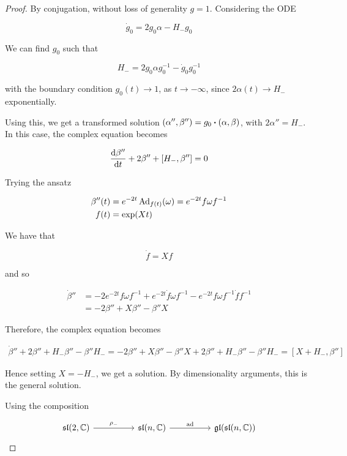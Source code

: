 \documentclass{report}
\renewcommand{\sl}{\mathfrak{sl}}
\begin{document}
\begin{proof}
    By conjugation, without loss of generality \(g = 1\). Considering the ODE

    \begin{equation*}
            \dot g_0 = 2g_0\alpha - H_-g_0
    \end{equation*}

    We can find \(g_0\) such that

    \[H_- = 2g_0\alpha g_0^{-1} - \dot g_0 g_0^{-1}\]

    with the boundary condition \(g_0(t) \to 1\), as \(t \to -\infty\), since \(2\alpha(t) \to H_-\) exponentially.

    Using this, we get a transformed solution \((\alpha'', \beta'') = g_0\vdot(\alpha,\beta)\), with \(2\alpha'' = H_-\). In this case, the complex equation becomes

    \[\dv{\beta''}{t} + 2\beta'' + [H_-, \beta''] = 0\]

    Trying the ansatz

    \begin{align*}
        \beta''(t) &= e^{-2t}\operatorname{Ad}_{f(t)}(\omega) = e^{-2t}f\omega f^{-1} \\
        f(t) &= \exp(Xt)
    \end{align*}

    We have that

    \[\dot f = Xf\]

    and so

    \begin{align*}
        \dot\beta'' &= -2e^{-2t}f\omega f^{-1} + e^{-2t}\dot f \omega f^{-1} - e^{-2t}f\omega f^{-1}\dot f f^{-1} \\
        &= -2\beta'' + X\beta'' - \beta'' X
    \end{align*}

    Therefore, the complex equation becomes

    \begin{align*}
        \dot\beta'' + 2\beta'' + H_-\beta'' - \beta''H_- = -2\beta'' + X\beta'' - \beta''X + 2\beta'' + H_-\beta'' - \beta''H_- = [X + H_-, \beta'']
    \end{align*}

    Hence setting \(X = -H_-\), we get a solution. By dimensionality arguments, this is the general solution.

    Using the composition

\[\begin{tikzcd}[ampersand replacement=\&]
	{\sl(2, \C)} \&\& {\sl(n, \C)} \&\& {\gl(\sl(n, \C))}
	\arrow["{\rho_-}", from=1-1, to=1-3]
	\arrow["\ad", from=1-3, to=1-5]
\end{tikzcd}\]


\end{proof}
\end{document}
